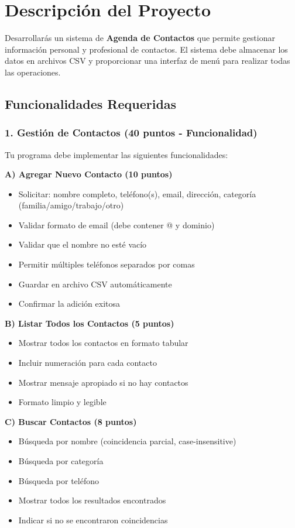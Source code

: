 \documentclass[11pt,letterpaper]{article}
\begin{document}
\section{Descripción del Proyecto}

Desarrollarás un sistema de \textbf{Agenda de Contactos} que permite gestionar información personal y profesional de contactos. El sistema debe almacenar los datos en archivos CSV y proporcionar una interfaz de menú para realizar todas las operaciones.

\subsection{Funcionalidades Requeridas}

\subsubsection{1. Gestión de Contactos (40 puntos - Funcionalidad)}

Tu programa debe implementar las siguientes funcionalidades:

\textbf{A) Agregar Nuevo Contacto (10 puntos)}
\begin{itemize}
    \item Solicitar: nombre completo, teléfono(s), email, dirección, categoría (familia/amigo/trabajo/otro)
    \item Validar formato de email (debe contener @ y dominio)
    \item Validar que el nombre no esté vacío
    \item Permitir múltiples teléfonos separados por comas
    \item Guardar en archivo CSV automáticamente
    \item Confirmar la adición exitosa
\end{itemize}

\textbf{B) Listar Todos los Contactos (5 puntos)}
\begin{itemize}
    \item Mostrar todos los contactos en formato tabular
    \item Incluir numeración para cada contacto
    \item Mostrar mensaje apropiado si no hay contactos
    \item Formato limpio y legible
\end{itemize}

\textbf{C) Buscar Contactos (8 puntos)}
\begin{itemize}
    \item Búsqueda por nombre (coincidencia parcial, case-insensitive)
    \item Búsqueda por categoría
    \item Búsqueda por teléfono
    \item Mostrar todos los resultados encontrados
    \item Indicar si no se encontraron coincidencias
\end{itemize}
\end{document}
